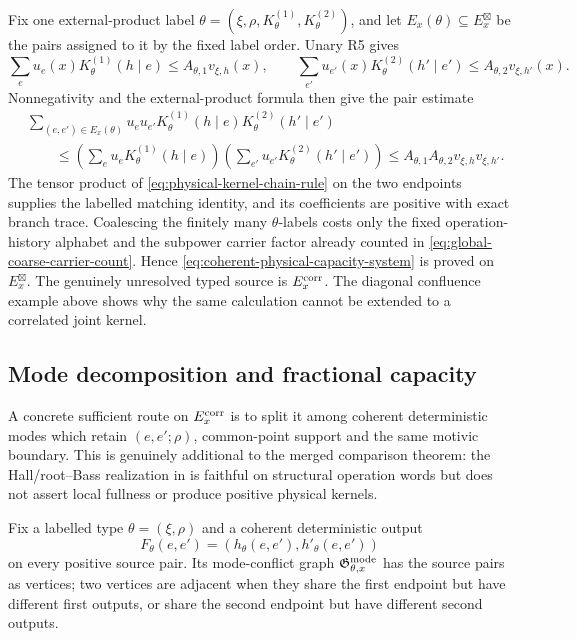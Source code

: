 \documentclass[11pt]{article}
\begin{document}
Fix one external-product label
\(\theta=(\xi,\rho,K_\theta^{(1)},K_\theta^{(2)})\), and let
\(E_x(\theta)\subseteq E_x^{\boxtimes}\) be the pairs assigned to it by the
fixed label order.  Unary R5 gives
\[
 \sum_e u_e(x)K_\theta^{(1)}(h\mid e)
 \le A_{\theta,1}v_{\xi,h}(x),
 \qquad
 \sum_{e'}u_{e'}(x)K_\theta^{(2)}(h'\mid e')
 \le A_{\theta,2}v_{\xi,h'}(x).
\]
Nonnegativity and the external-product formula then give the pair estimate
\begin{equation}\label{eq:external-span-pair-capacity}
 \boxed{
 \begin{aligned}
 &\sum_{(e,e')\in E_x(\theta)}
  u_eu_{e'}K_\theta^{(1)}(h\mid e)
             K_\theta^{(2)}(h'\mid e')\\
 &\qquad\le
 \left(\sum_eu_eK_\theta^{(1)}(h\mid e)\right)
 \left(\sum_{e'}u_{e'}K_\theta^{(2)}(h'\mid e')\right)
 \le
 A_{\theta,1}A_{\theta,2}
 v_{\xi,h}v_{\xi,h'} .
 \end{aligned}}
\end{equation}
The tensor product of \eqref{eq:physical-kernel-chain-rule} on the two
endpoints supplies the labelled matching identity, and its coefficients are
positive with exact branch trace.  Coalescing the finitely many
\(\theta\)-labels costs only the fixed operation-history alphabet and the
subpower carrier factor already counted in
\eqref{eq:global-coarse-carrier-count}.  Hence
\eqref{eq:coherent-physical-capacity-system} is proved on
\(E_x^{\boxtimes}\).  The genuinely unresolved typed source is
\(E_x^{\rm corr}\).  The diagonal confluence example above shows why the same
calculation cannot be extended to a correlated joint kernel.

\subsection{Mode decomposition and fractional capacity}

A concrete sufficient route on \(E_x^{\rm corr}\) is to split it among
coherent deterministic modes which retain \((e,e';\rho)\), common-point
support and the same motivic boundary.  This is genuinely additional to the
merged comparison theorem: the Hall/root--Bass realization in
\cite{UnifiedTower} is faithful on structural operation words but does not
assert local fullness or produce positive physical kernels.

Fix a labelled type \(\theta=(\xi,\rho)\) and a coherent deterministic output
\[
 F_\theta(e,e')=(h_\theta(e,e'),h'_\theta(e,e'))
\]
on every positive source pair.  Its mode-conflict graph
\(\mathfrak G_{\theta,x}^{\rm mode}\) has the source pairs as vertices; two
vertices are adjacent when they share the first endpoint but have different
first outputs, or share the second endpoint but have different second outputs.
\end{document}
